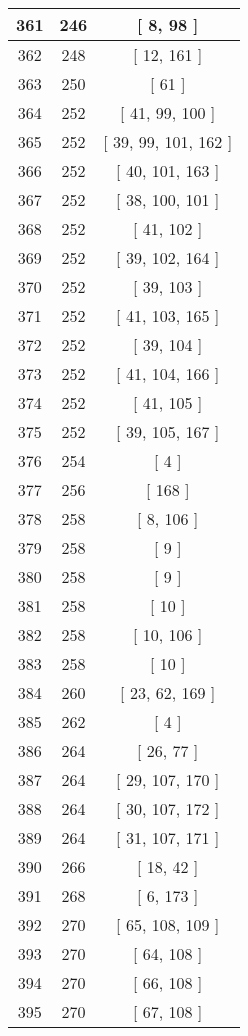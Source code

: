\begin{center}
\begin{longtable}[H]{|| c c c ||}
\hline
361 & 246 & [ 8, 98 ] \\ 
\hline
362 & 248 & [ 12, 161 ] \\ 
\hline
363 & 250 & [ 61 ] \\ 
\hline
364 & 252 & [ 41, 99, 100 ] \\ 
\hline
365 & 252 & [ 39, 99, 101, 162 ] \\ 
\hline
366 & 252 & [ 40, 101, 163 ] \\ 
\hline
367 & 252 & [ 38, 100, 101 ] \\ 
\hline
368 & 252 & [ 41, 102 ] \\ 
\hline
369 & 252 & [ 39, 102, 164 ] \\ 
\hline
370 & 252 & [ 39, 103 ] \\ 
\hline
371 & 252 & [ 41, 103, 165 ] \\ 
\hline
372 & 252 & [ 39, 104 ] \\ 
\hline
373 & 252 & [ 41, 104, 166 ] \\ 
\hline
374 & 252 & [ 41, 105 ] \\ 
\hline
375 & 252 & [ 39, 105, 167 ] \\ 
\hline
376 & 254 & [ 4 ] \\ 
\hline
377 & 256 & [ 168 ] \\ 
\hline
378 & 258 & [ 8, 106 ] \\ 
\hline
379 & 258 & [ 9 ] \\ 
\hline
380 & 258 & [ 9 ] \\ 
\hline
381 & 258 & [ 10 ] \\ 
\hline
382 & 258 & [ 10, 106 ] \\ 
\hline
383 & 258 & [ 10 ] \\ 
\hline
384 & 260 & [ 23, 62, 169 ] \\ 
\hline
385 & 262 & [ 4 ] \\ 
\hline
386 & 264 & [ 26, 77 ] \\ 
\hline
387 & 264 & [ 29, 107, 170 ] \\ 
\hline
388 & 264 & [ 30, 107, 172 ] \\ 
\hline
389 & 264 & [ 31, 107, 171 ] \\ 
\hline
390 & 266 & [ 18, 42 ] \\ 
\hline
391 & 268 & [ 6, 173 ] \\ 
\hline
392 & 270 & [ 65, 108, 109 ] \\ 
\hline
393 & 270 & [ 64, 108 ] \\ 
\hline
394 & 270 & [ 66, 108 ] \\ 
\hline
395 & 270 & [ 67, 108 ] \\ 

\end{longtable}
\end{center}
